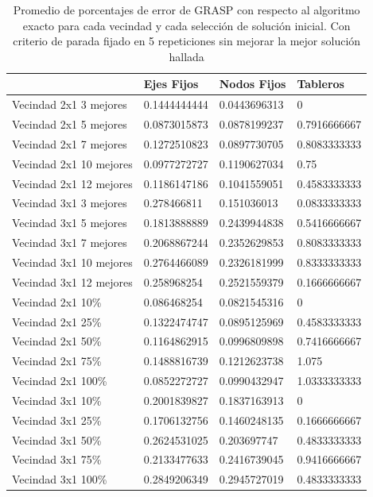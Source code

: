 \begin{table}[h!]
	\begin{tabular}[c]{|l|l|l|l|}
	\hline & Ejes Fijos & Nodos Fijos & Tableros \\
	\hline Vecindad 2x1 3 mejores & 0.1444444444 & 0.0443696313 & 0 \\
	\hline Vecindad 2x1 5 mejores & 0.0873015873 & 0.0878199237 & 0.7916666667 \\
	\hline Vecindad 2x1 7 mejores & 0.1272510823 & 0.0897730705 & 0.8083333333 \\
	\hline Vecindad 2x1 10 mejores & 0.0977272727 & 0.1190627034 & 0.75 \\
	\hline Vecindad 2x1 12 mejores & 0.1186147186 & 0.1041559051 & 0.4583333333 \\
	\hline Vecindad 3x1 3 mejores & 0.278466811 & 0.151036013 & 0.0833333333 \\
	\hline Vecindad 3x1 5 mejores & 0.1813888889 & 0.2439944838 & 0.5416666667 \\
	\hline Vecindad 3x1 7 mejores & 0.2068867244 & 0.2352629853 & 0.8083333333 \\
	\hline Vecindad 3x1 10 mejores & 0.2764466089 & 0.2326181999 & 0.8333333333 \\
	\hline Vecindad 3x1 12 mejores & 0.258968254 & 0.2521559379 & 0.1666666667 \\
	\hline Vecindad 2x1 10\% & 0.086468254 & 0.0821545316 & 0 \\
	\hline Vecindad 2x1 25\% & 0.1322474747 & 0.0895125969 & 0.4583333333 \\
	\hline Vecindad 2x1 50\% & 0.1164862915 & 0.0996809898 & 0.7416666667 \\
	\hline Vecindad 2x1 75\% & 0.1488816739 & 0.1212623738 & 1.075 \\
	\hline Vecindad 2x1 100\% & 0.0852272727 & 0.0990432947 & 1.0333333333 \\
	\hline Vecindad 3x1 10\% & 0.2001839827 & 0.1837163913 & 0 \\
	\hline Vecindad 3x1 25\% & 0.1706132756 & 0.1460248135 & 0.1666666667 \\
	\hline Vecindad 3x1 50\% & 0.2624531025 & 0.203697747 & 0.4833333333 \\
	\hline Vecindad 3x1 75\% & 0.2133477633 & 0.2416739045 & 0.9416666667 \\
	\hline Vecindad 3x1 100\% & 0.2849206349 & 0.2945727019 & 0.4833333333 \\
	\hline
	\end{tabular}
\caption{Promedio de porcentajes de error de GRASP con respecto al algoritmo exacto para cada vecindad y cada selecci\'on de soluci\'on inicial. Con criterio de parada fijado en 5 repeticiones sin mejorar la mejor soluci\'on hallada}
\end{table}
 
